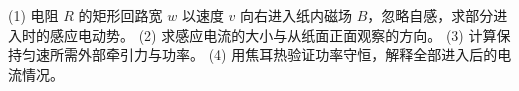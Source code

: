 (1) 电阻 \(R\) 的矩形回路宽 \(w\) 以速度 \(v\) 向右进入纸内磁场 \(B\)，忽略自感，求部分进入时的感应电动势。
(2) 求感应电流的大小与从纸面正面观察的方向。
(3) 计算保持匀速所需外部牵引力与功率。
(4) 用焦耳热验证功率守恒，解释全部进入后的电流情况。
